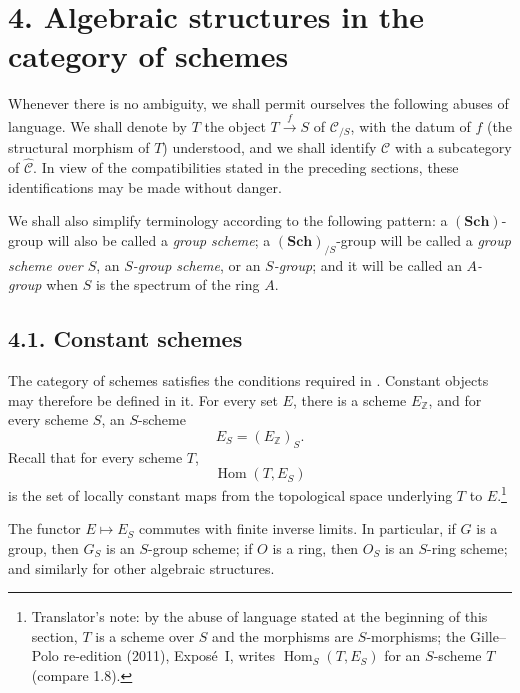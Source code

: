 
\section*{4. Algebraic structures in the category of schemes}

Whenever there is no ambiguity, we shall permit ourselves the following
abuses of language. We shall denote by \(T\) the object
\(T\xrightarrow{f}S\) of \(\mathscr C_{/S}\), with the datum of \(f\)
(the structural morphism of \(T\)) understood, and we shall identify
\(\mathscr C\) with a subcategory of \(\widehat{\mathscr C}\). In view of
the compatibilities stated in the preceding sections, these identifications
may be made without danger.

We shall also simplify terminology according to the following pattern: a
\((\mathbf{Sch})\)-group will also be called a \emph{group scheme}; a
\((\mathbf{Sch})_{/S}\)-group will be called a \emph{group scheme over
\(S\)}, an \emph{\(S\)-group scheme}, or an \emph{\(S\)-group}; and it
will be called an \emph{\(A\)-group} when \(S\) is the spectrum of the
ring \(A\).

\subsection*{4.1. Constant schemes}

The category of schemes satisfies the conditions required in . Constant
objects may therefore be defined in it. For every set \(E\), there is a
scheme \(E_{\mathbb Z}\), and for every scheme \(S\), an \(S\)-scheme
\[
  E_S=(E_{\mathbb Z})_S.
\]
Recall that for every scheme \(T\),
\[
  \operatorname{Hom}(T,E_S)
\]
is the set of locally constant maps from the topological space underlying
\(T\) to \(E\).\footnote{Translator's note: by the abuse of language stated at the beginning of
this section, \(T\) is a scheme over \(S\) and the morphisms are
\(S\)-morphisms; the Gille--Polo re-edition (2011), Exposé~I, writes
\(\operatorname{Hom}_S(T,E_S)\) for an \(S\)-scheme \(T\) (compare 1.8).}

The functor \(E\mapsto E_S\) commutes with finite inverse limits. In
particular, if \(G\) is a group, then \(G_S\) is an \(S\)-group scheme;
if \(O\) is a ring, then \(O_S\) is an \(S\)-ring scheme; and similarly
for other algebraic structures.

